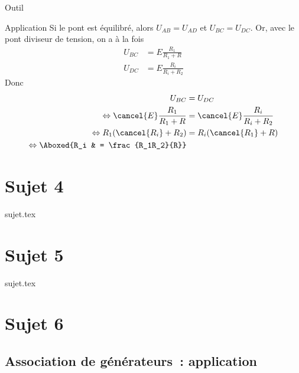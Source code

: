 \documentclass[a4paper, 11pt]{book}
\begin{document}
{\begin{tcbraster}[raster columns=6, raster equal height=rows]
\begin{tcolorbox}[blankest, raster multicolumn=1, space to=\myspace]
\begin{tcbraster}[raster columns=1]
\begin{NCrapp}{Outil}
				\end{NCrapp}
			\end{tcbraster}
		\end{tcolorbox}
		\begin{NCexem}[raster multicolumn=3]{Application} Si le pont est
			équilibré, alors $U_{AB} = U_{AD}$ et $U_{BC} = U_{DC}$. Or, avec le
			pont diviseur de tension, on a à la fois
			\begin{align*}
				U_{BC} & = E \frac{R_1}{R_1+R}   \\
				U_{DC} & = E \frac{R_i}{R_i+R_2}
			\end{align*}
			Donc
			\begin{align*}
				U_{BC}                                & = U_{DC}                         \\
				\Leftrightarrow \cancel{E} \frac{R_1}{R_1+R}
				                                      & = \cancel{E} \frac{R_i}{R_i+R_2} \\
				\Leftrightarrow R_1(\cancel{R_i}+R_2) & = R_i(\cancel{R_1}+R)            \\
				\Leftrightarrow \Aboxed{R_i           & = \frac{R_1R_2}{R}}
			\end{align*}
		\end{NCexem}
	\end{tcbraster}
}

\resetQ
\newpage

\chapter{Sujet 4}
{sujet.tex}

\resetQ
\newpage

\chapter{Sujet 5}
{sujet.tex}

\resetQ
\newpage

\chapter{Sujet 6}

\section{Association de générateurs~: application}
\end{document}
